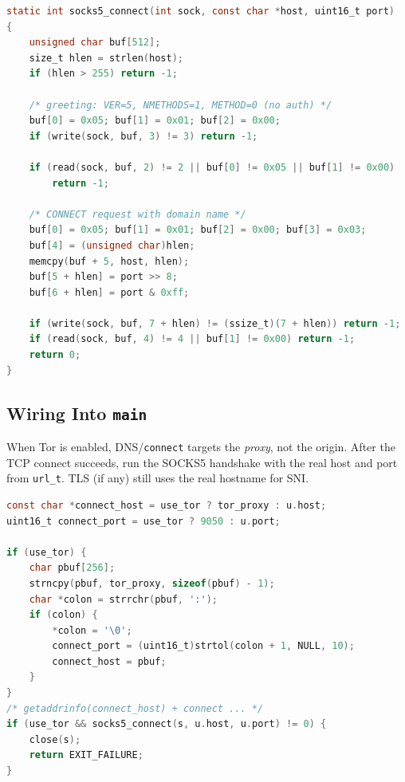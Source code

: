 \begin{lstlisting}[style=snippet,language=C]
static int socks5_connect(int sock, const char *host, uint16_t port)
{
    unsigned char buf[512];
    size_t hlen = strlen(host);
    if (hlen > 255) return -1;

    /* greeting: VER=5, NMETHODS=1, METHOD=0 (no auth) */
    buf[0] = 0x05; buf[1] = 0x01; buf[2] = 0x00;
    if (write(sock, buf, 3) != 3) return -1;

    if (read(sock, buf, 2) != 2 || buf[0] != 0x05 || buf[1] != 0x00)
        return -1;

    /* CONNECT request with domain name */
    buf[0] = 0x05; buf[1] = 0x01; buf[2] = 0x00; buf[3] = 0x03;
    buf[4] = (unsigned char)hlen;
    memcpy(buf + 5, host, hlen);
    buf[5 + hlen] = port >> 8;
    buf[6 + hlen] = port & 0xff;

    if (write(sock, buf, 7 + hlen) != (ssize_t)(7 + hlen)) return -1;
    if (read(sock, buf, 4) != 4 || buf[1] != 0x00) return -1;
    return 0;
}
\end{lstlisting}

\subsection{Wiring Into \texttt{main}}

When Tor is enabled, DNS/\texttt{connect} targets the \emph{proxy}, not the
origin. After the TCP connect succeeds, run the SOCKS5 handshake with the
real host and port from \texttt{url\_t}. TLS (if any) still uses the real
hostname for SNI.

\begin{lstlisting}[style=snippet,language=C]
const char *connect_host = use_tor ? tor_proxy : u.host;
uint16_t connect_port = use_tor ? 9050 : u.port;

if (use_tor) {
    char pbuf[256];
    strncpy(pbuf, tor_proxy, sizeof(pbuf) - 1);
    char *colon = strrchr(pbuf, ':');
    if (colon) {
        *colon = '\0';
        connect_port = (uint16_t)strtol(colon + 1, NULL, 10);
        connect_host = pbuf;
    }
}
/* getaddrinfo(connect_host) + connect ... */
if (use_tor && socks5_connect(s, u.host, u.port) != 0) {
    close(s);
    return EXIT_FAILURE;
}
\end{lstlisting}

